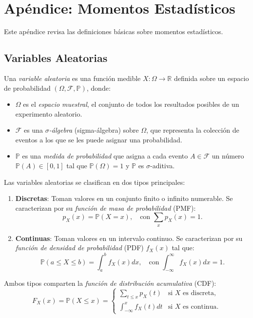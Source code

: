 \newpage
\appendix

\section*{Apéndice: Momentos Estadísticos}

Este apéndice revisa las definiciones básicas sobre momentos estadísticos.

\subsection*{Variables Aleatorias}

Una \textit{variable aleatoria} es una función medible $X: \Omega \to \mathbb{R}$ definida sobre un espacio de probabilidad $(\Omega, \mathcal{F}, \mathbb{P})$, donde:
\begin{itemize}
  \item $\Omega$ es el \textit{espacio muestral}, el conjunto de todos los resultados posibles de un experimento aleatorio.
  \item $\mathcal{F}$ es una \textit{$\sigma$-álgebra} (sigma-álgebra) sobre $\Omega$, que representa la colección de eventos a los que se les puede asignar una probabilidad.
  \item $\mathbb{P}$ es una \textit{medida de probabilidad} que asigna a cada evento $A \in \mathcal{F}$ un número $\mathbb{P}(A) \in [0,1]$ tal que $\mathbb{P}(\Omega) = 1$ y $\mathbb{P}$ es $\sigma$-aditiva.
\end{itemize}

Las variables aleatorias se clasifican en dos tipos principales:

\begin{enumerate}
  \item \textbf{Discretas}: Toman valores en un conjunto finito o infinito numerable. Se caracterizan por su \textit{función de masa de probabilidad} (PMF):
  \[
  p_X(x) = \mathbb{P}(X = x), \quad \text{con } \sum_{x} p_X(x) = 1.
  \]
  
  \item \textbf{Continuas}: Toman valores en un intervalo continuo. Se caracterizan por su \textit{función de densidad de probabilidad} (PDF) $f_X(x)$ tal que:
  \[
  \mathbb{P}(a \leq X \leq b) = \int_a^b f_X(x) dx, \quad \text{con } \int_{-\infty}^{\infty} f_X(x) dx = 1.
  \]
\end{enumerate}

Ambos tipos comparten la \textit{función de distribución acumulativa} (CDF):
\[
F_X(x) = \mathbb{P}(X \leq x) = \begin{cases}
\sum_{t \leq x} p_X(t) & \text{si } X \text{ es discreta},\\
\int_{-\infty}^{x} f_X(t) dt & \text{si } X \text{ es continua}.
\end{cases}
\]

